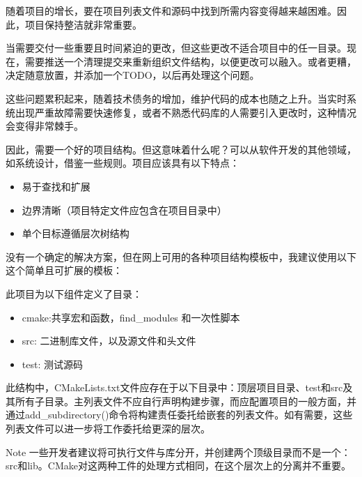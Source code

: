 

随着项目的增长，要在项目列表文件和源码中找到所需内容变得越来越困难。因此，项目保持整洁就非常重要。

当需要交付一些重要且时间紧迫的更改，但这些更改不适合项目中的任一目录。现在，需要推送一个清理提交来重新组织文件结构，以便更改可以融入。或者更糟，决定随意放置，并添加一个TODO，以后再处理这个问题。

这些问题累积起来，随着技术债务的增加，维护代码的成本也随之上升。当实时系统出现严重故障需要快速修复，或者不熟悉代码库的人需要引入更改时，这种情况会变得非常棘手。

因此，需要一个好的项目结构。但这意味着什么呢？可以从软件开发的其他领域，如系统设计，借鉴一些规则。项目应该具有以下特点：

\begin{itemize}
\item
易于查找和扩展

\item
边界清晰（项目特定文件应包含在项目目录中）

\item
单个目标遵循层次树结构
\end{itemize}

没有一个确定的解决方案，但在网上可用的各种项目结构模板中，我建议使用以下这个简单且可扩展的模板：


此项目为以下组件定义了目录：

\begin{itemize}
\item
cmake:共享宏和函数，find\_modules 和一次性脚本

\item
src: 二进制库文件，以及源文件和头文件

\item
test: 测试源码
\end{itemize}

此结构中，CMakeLists.txt文件应存在于以下目录中：顶层项目目录、test和src及其所有子目录。主列表文件不应自行声明构建步骤，而应配置项目的一般方面，并通过add\_subdirectory()命令将构建责任委托给嵌套的列表文件。如有需要，这些列表文件可以进一步将工作委托给更深的层次。

\begin{myNotic}{Note}
一些开发者建议将可执行文件与库分开，并创建两个顶级目录而不是一个：src和lib。CMake对这两种工件的处理方式相同，在这个层次上的分离并不重要。
\end{myNotic}

